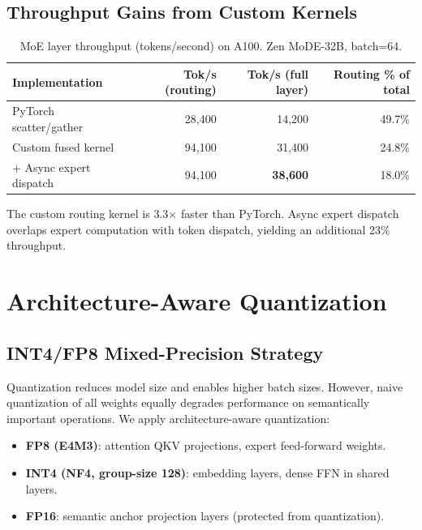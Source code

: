 \documentclass[11pt,a4paper]{article}
\begin{document}
\subsection{Throughput Gains from Custom Kernels}

\begin{table}[H]
\centering
\caption{MoE layer throughput (tokens/second) on A100. Zen MoDE-32B, batch=64.}
\begin{tabular}{lrrr}
\toprule
\textbf{Implementation} & \textbf{Tok/s (routing)} & \textbf{Tok/s (full layer)} & \textbf{Routing \% of total} \\
\midrule
PyTorch scatter/gather  & 28,400 & 14,200 & 49.7\% \\
Custom fused kernel     & 94,100 & 31,400 & 24.8\% \\
+ Async expert dispatch & 94,100 & \textbf{38,600} & 18.0\% \\
\bottomrule
\end{tabular}
\label{tab:moe_kernels}
\end{table}

The custom routing kernel is 3.3$\times$ faster than PyTorch. Async expert dispatch
overlaps expert computation with token dispatch, yielding an additional 23\% throughput.

\section{Architecture-Aware Quantization}
\label{sec:quantization}

\subsection{INT4/FP8 Mixed-Precision Strategy}

Quantization reduces model size and enables higher batch sizes. However, naive
quantization of all weights equally degrades performance on semantically important
operations. We apply architecture-aware quantization:

\begin{itemize}
    \item \textbf{FP8 (E4M3)}: attention QKV projections, expert feed-forward weights.
    \item \textbf{INT4 (NF4, group-size 128)}: embedding layers, dense FFN in shared layers.
    \item \textbf{FP16}: semantic anchor projection layers (protected from quantization).
\end{itemize}
\end{document}
